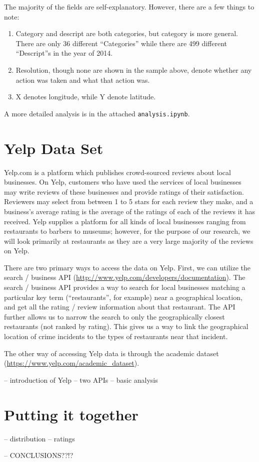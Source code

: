 \documentclass{article}
\begin{document}
The majority of the fields are self-explanatory. However, there are a few
things to note:
\begin{enumerate}
\item Category and descript are both categories, but category is more
  general. There are only 36 different ``Categories'' while there are 499
  different ``Descript''s in the year of 2014.
\item Resolution, though none are shown in the sample above, denote whether
  any action was taken and what that action was.
\item X denotes longitude, while Y denote latitude.
\end{enumerate}

A more detailed analysis is in the attached \texttt{analysis.ipynb}.

\section{Yelp Data Set}

Yelp.com is a platform which publishes crowd-sourced reviews about local
businesses. On Yelp, customers who have used the services of local
businesses may write reviews of these businesses and provide ratings of
their satisfaction. Reviewers may select from between 1 to 5 stars for each
review they make, and a business's average rating is the average of the
ratings of each of the reviews it has received. Yelp supplies a platform
for all kinds of local businesses ranging from restaurants to barbers to
museums; however, for the purpose of our research, we will look primarily
at restaurants as they are a very large majority of the reviews on Yelp.

There are two primary ways to access the data on Yelp. First, we can
utilize the search / business API
(\url{http://www.yelp.com/developers/documentation}). The search / business
API provides a way to search for local businesses matching a particular key
term (``restaurants'', for example) near a geographical location, and get
all the rating / review information about that restaurant. The API further
allows us to narrow the search to only the geographically closest
restaurants (not ranked by rating). This gives us a way to link the
geographical location of crime incidents to the types of restaurants near
that incident.

The other way of accessing Yelp data is through the academic dataset
(\url{https://www.yelp.com/academic_dataset}).

-- introduction of Yelp
-- two APIs
-- basic analysis

\section{Putting it together}

-- distribution
-- ratings

-- CONCLUSIONS??!?
\end{document}
